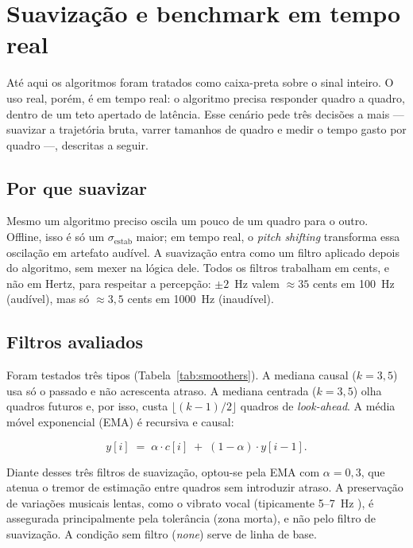 \section{Suavização e benchmark em tempo real}
\label{sec:benchmark_realtime}

Até aqui os algoritmos foram tratados como caixa-preta sobre o sinal inteiro. O uso real, porém, é em tempo real: o algoritmo precisa responder quadro a quadro, dentro de um teto apertado de latência. Esse cenário pede três decisões a mais --- suavizar a trajetória bruta, varrer tamanhos de quadro e medir o tempo gasto por quadro ---, descritas a seguir.

\subsection{Por que suavizar}
Mesmo um algoritmo preciso oscila um pouco de um quadro para o outro. Offline, isso é só um $\sigma_{\text{estab}}$ maior; em tempo real, o \textit{pitch shifting} transforma essa oscilação em artefato audível. A suavização entra como um filtro aplicado depois do algoritmo, sem mexer na lógica dele. Todos os filtros trabalham em cents, e não em Hertz, para respeitar a percepção: $\pm 2$~Hz valem $\approx 35$ cents em 100~Hz (audível), mas só $\approx 3{,}5$ cents em 1000~Hz (inaudível).

\subsection{Filtros avaliados}
Foram testados três tipos (Tabela~\ref{tab:smoothers}). A mediana causal ($k = 3, 5$) usa só o passado e não acrescenta atraso. A mediana centrada ($k = 3, 5$) olha quadros futuros e, por isso, custa $\lfloor (k-1)/2 \rfloor$ quadros de \textit{look-ahead}. A média móvel exponencial (EMA) é recursiva e causal:

\begin{equation}
\label{eq:ema}
y[i] \;=\; \alpha \cdot c[i] \;+\; (1 - \alpha) \cdot y[i-1].
\end{equation}

  \noindent Diante desses três filtros de suavização, optou-se pela EMA com $\alpha = 0{,}3$, que atenua o tremor de estimação entre quadros sem introduzir atraso. A preservação de variações musicais lentas, como o vibrato vocal (tipicamente 5--7~Hz \cite{prame1994vibrato}), é assegurada principalmente pela tolerância (zona morta), e não pelo filtro de suavização. A condição sem filtro (\textit{none}) serve de linha de base.

